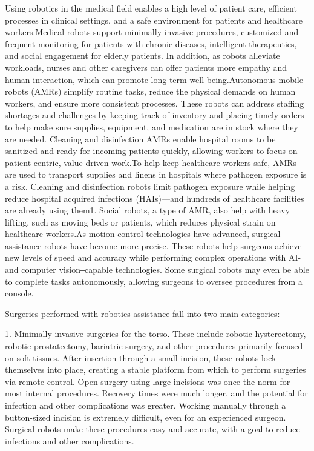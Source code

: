 \documentclass[12pt,a4paper]{report}
\begin{document}
Using robotics in the medical field enables a high level of patient care, efficient processes in clinical settings, and a safe environment for patients and healthcare workers.Medical robots support minimally invasive procedures, customized and frequent monitoring for patients with chronic diseases, intelligent therapeutics, and social engagement for elderly patients. In addition, as robots alleviate workloads, nurses and other caregivers can offer patients more empathy and human interaction, which can promote long-term well-being.Autonomous mobile robots (AMRs) simplify routine tasks, reduce the physical demands on human workers, and ensure more consistent processes. These robots can address staffing shortages and challenges by keeping track of inventory and placing timely orders to help make sure supplies, equipment, and medication are in stock where they are needed. Cleaning and disinfection AMRs enable hospital rooms to be sanitized and ready for incoming patients quickly, allowing workers to focus on patient-centric, value-driven work.To help keep healthcare workers safe, AMRs are used to transport supplies and linens in hospitals where pathogen exposure is a risk. Cleaning and disinfection robots limit pathogen exposure while helping reduce hospital acquired infections (HAIs)—and hundreds of healthcare facilities are already using them1. Social robots, a type of AMR, also help with heavy lifting, such as moving beds or patients, which reduces physical strain on healthcare workers.As motion control technologies have advanced, surgical-assistance robots have become more precise. These robots help surgeons achieve new levels of speed and accuracy while performing complex operations with AI- and computer vision‒capable technologies. Some surgical robots may even be able to complete tasks autonomously, allowing surgeons to oversee procedures from a console.\par

Surgeries performed with robotics assistance fall into two main categories:-\par
1. Minimally invasive surgeries for the torso. These include robotic hysterectomy, robotic prostatectomy, bariatric surgery, and other procedures primarily focused on soft tissues. After insertion through a small incision, these robots lock themselves into place, creating a stable platform from which to perform surgeries via remote control. Open surgery using large incisions was once the norm for most internal procedures. Recovery times were much longer, and the potential for infection and other complications was greater. Working manually through a button-sized incision is extremely difficult, even for an experienced surgeon. Surgical robots make these procedures easy and accurate, with a goal to reduce infections and other complications.\par
\end{document}

